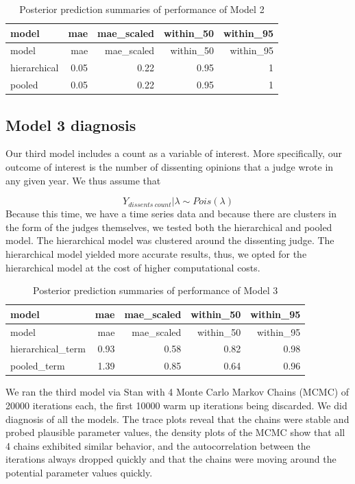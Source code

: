\documentclass[
  11pt,
]{article}
\begin{document}
\begin{longtable}[]{@{}lrrrr@{}}
\caption{Posterior prediction summaries of performance of Model
2}\tabularnewline
\toprule\noalign{}
model & mae & mae\_scaled & within\_50 & within\_95 \\
\midrule\noalign{}
\endfirsthead
\toprule\noalign{}
model & mae & mae\_scaled & within\_50 & within\_95 \\
\midrule\noalign{}
\endhead
\bottomrule\noalign{}
\endlastfoot
hierarchical & 0.05 & 0.22 & 0.95 & 1 \\
pooled & 0.05 & 0.22 & 0.95 & 1 \\
\end{longtable}

\hypertarget{model-3-diagnosis}{%
\subsection{Model 3 diagnosis}\label{model-3-diagnosis}}

Our third model includes a count as a variable of interest. More
specifically, our outcome of interest is the number of dissenting
opinions that a judge wrote in any given year. We thus assume that

\[
Y_{dissents\:count} | \lambda \sim Pois(\lambda)
\] Because this time, we have a time series data and because there are
clusters in the form of the judges themselves, we tested both the
hierarchical and pooled model. The hierarchical model was clustered
around the dissenting judge. The hierarchical model yielded more
accurate results, thus, we opted for the hierarchical model at the cost
of higher computational costs.

\begin{longtable}[]{@{}lrrrr@{}}
\caption{Posterior prediction summaries of performance of Model
3}\tabularnewline
\toprule\noalign{}
model & mae & mae\_scaled & within\_50 & within\_95 \\
\midrule\noalign{}
\endfirsthead
\toprule\noalign{}
model & mae & mae\_scaled & within\_50 & within\_95 \\
\midrule\noalign{}
\endhead
\bottomrule\noalign{}
\endlastfoot
hierarchical\_term & 0.93 & 0.58 & 0.82 & 0.98 \\
pooled\_term & 1.39 & 0.85 & 0.64 & 0.96 \\
\end{longtable}

We ran the third model via Stan with 4 Monte Carlo Markov Chains (MCMC)
of 20000 iterations each, the first 10000 warm up iterations being
discarded. We did diagnosis of all the models. The trace plots reveal
that the chains were stable and probed plausible parameter values, the
density plots of the MCMC show that all 4 chains exhibited similar
behavior, and the autocorrelation between the iterations always dropped
quickly and that the chains were moving around the potential parameter
values quickly.
\end{document}
